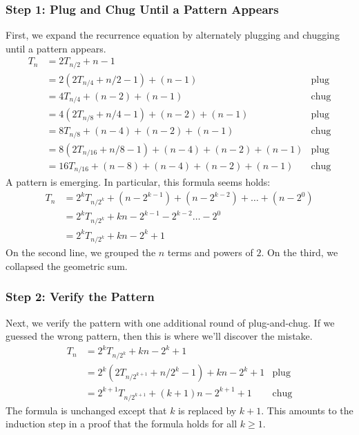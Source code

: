 \subsubsection*{Step 1: Plug and Chug Until a Pattern Appears}

First, we expand the recurrence equation by alternately plugging and
chugging until a pattern appears.
\begin{align*}
T_n & = 2T_{n/2} + n - 1 \\
  & = 2 (2 T_{n/4} + n/2 - 1)  + (n - 1) & \text{plug} \\
  & = 4 T_{n/4} + (n - 2) + (n - 1) & \text{chug} \\
  & = 4 (2 T_{n/8} + n / 4 - 1) + (n - 2) + (n - 1) & \text{plug} \\
  & = 8 T_{n/8} + (n - 4) + (n - 2) + (n - 1) & \text{chug} \\
  & = 8 (2 T_{n/16} + n / 8 - 1) +  (n - 4) + (n - 2) + (n - 1) &
  \text{plug} \\
  & = 16 T_{n/16} + (n - 8) + (n - 4) + (n - 2) + (n - 1) & \text{chug}
\end{align*}
A pattern is emerging.  In particular, this formula seems holds:
\begin{align*}
T_n & = 2^k T_{n/2^k} + (n - 2^{k-1}) + (n - 2^{k -2}) + \ldots + (n -
2^0) \\
  & = 2^k T_{n/2^k} + k n - 2^{k-1}  - 2^{k-2} \ldots - 2^0 \\
  & = 2^k T_{n/2^k} + k n - 2^k + 1
\end{align*}
On the second line, we grouped the $n$ terms and powers of $2$.  On
the third, we collapsed the geometric sum.

\subsubsection*{Step 2:  Verify the Pattern}

Next, we verify the pattern with one additional round of
plug-and-chug.  If we guessed the wrong pattern, then this is where
we'll discover the mistake.
\begin{align*}
T_n & = 2^k T_{n/2^k} + k n - 2^k + 1 \\
 & = 2^k (2 T_{n/2^{k+1}} + n/2^k - 1) + kn - 2^k + 1 & \text{plug} \\
 & = 2^{k+1} T_{n/2^{k+1}}  + (k+ 1) n - 2^{k+1} + 1 & \text{chug}
\end{align*}
The formula is unchanged except that $k$ is replaced by $k+1$.  This
amounts to the induction step in a proof that the formula holds for
all $k \geq 1$.

